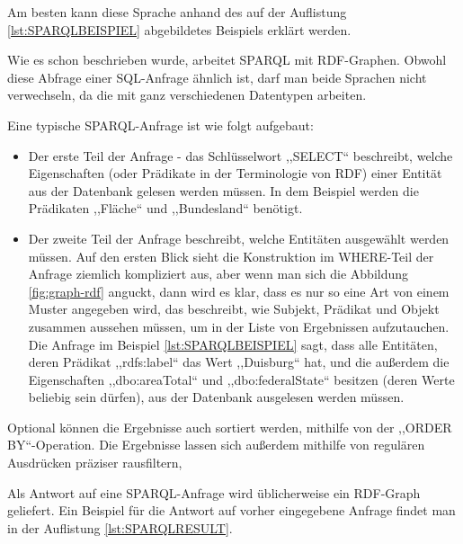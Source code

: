 Am besten kann diese Sprache anhand des auf der Auflistung \ref{lst:SPARQLBEISPIEL} abgebildetes Beispiels erklärt werden.
\lstset{language=SPARQL}


Wie es schon beschrieben wurde, arbeitet SPARQL mit RDF-Graphen. Obwohl diese Abfrage einer SQL-Anfrage ähnlich ist, darf man beide Sprachen nicht verwechseln, da die mit ganz verschiedenen Datentypen arbeiten. 

Eine typische SPARQL-Anfrage ist wie folgt aufgebaut:
\begin{itemize}
\item Der erste Teil der Anfrage - das Schlüsselwort ,,SELECT`` beschreibt, welche Eigenschaften (oder Prädikate in der Terminologie von RDF) einer Entität aus der Datenbank gelesen werden müssen. In dem Beispiel werden die Prädikaten ,,Fläche`` und ,,Bundesland`` benötigt.
\item Der zweite Teil der Anfrage beschreibt, welche Entitäten ausgewählt werden müssen. Auf den ersten Blick sieht die Konstruktion im WHERE-Teil der Anfrage ziemlich kompliziert aus, aber wenn man sich die Abbildung \ref{fig:graph-rdf} anguckt, dann wird es klar, dass es nur so eine Art von einem Muster angegeben wird, das beschreibt, wie Subjekt, Prädikat und Objekt zusammen aussehen müssen, um in der Liste von Ergebnissen aufzutauchen. Die Anfrage im Beispiel \ref{lst:SPARQLBEISPIEL} sagt, dass alle Entitäten, deren Prädikat ,,rdfs:label`` das Wert ,,Duisburg`` hat, und die  außerdem die Eigenschaften ,,dbo:areaTotal`` und ,,dbo:federalState`` besitzen (deren Werte beliebig sein dürfen), aus der Datenbank ausgelesen werden müssen.
\end{itemize}

Optional können die Ergebnisse auch sortiert werden, mithilfe von der ,,ORDER BY``-Operation. Die Ergebnisse lassen sich außerdem mithilfe von regulären Ausdrücken präziser rausfiltern,

Als Antwort auf eine SPARQL-Anfrage wird üblicherweise ein RDF-Graph geliefert. Ein Beispiel für die Antwort auf vorher eingegebene Anfrage findet man in der Auflistung \ref{lst:SPARQLRESULT}.

\lstset{language=XML}


